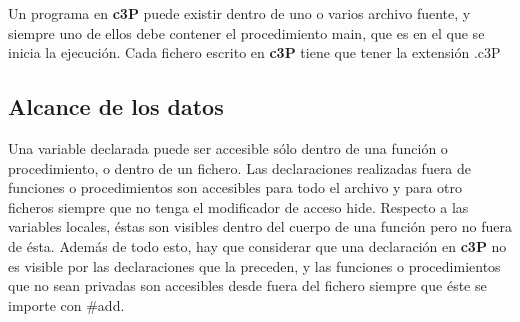 
Un programa en \textbf{c3P} puede existir dentro de uno o varios archivo fuente, y siempre uno
de ellos debe contener el procedimiento main, que es en el que se inicia la ejecución.
Cada fichero escrito en \textbf{c3P} tiene que tener la extensión .c3P

\subsection{Alcance de los datos}

Una variable declarada puede ser accesible sólo dentro de una función o procedimiento,
o dentro de un fichero. Las declaraciones realizadas fuera de funciones o procedimientos
son accesibles para todo el archivo y para otro ficheros siempre que no tenga el modificador
de acceso hide. Respecto a las variables locales, éstas son visibles dentro del cuerpo de
una función pero no fuera de ésta. Además de todo esto, hay que considerar que una declaración
en \textbf{c3P} no es visible por las declaraciones que la preceden, y las funciones o procedimientos
que no sean privadas son accesibles desde fuera del fichero siempre que éste se importe con \#add.